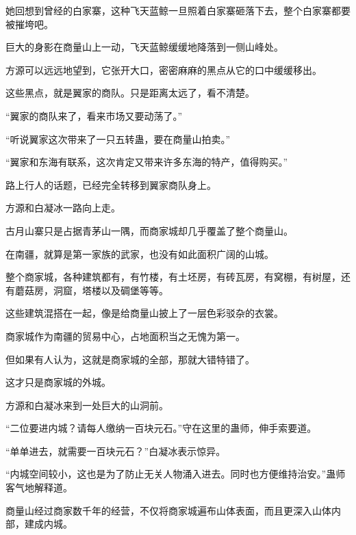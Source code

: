 \begin{this_body}
她回想到曾经的白家寨，这种飞天蓝鲸一旦照着白家寨砸落下去，整个白家寨都要被摧垮吧。

巨大的身影在商量山上一动，飞天蓝鲸缓缓地降落到一侧山峰处。

方源可以远远地望到，它张开大口，密密麻麻的黑点从它的口中缓缓移出。

这些黑点，就是翼家的商队。只是距离太远了，看不清楚。

“翼家的商队来了，看来市场又要动荡了。”

“听说翼家这次带来了一只五转蛊，要在商量山拍卖。”

“翼家和东海有联系，这次肯定又带来许多东海的特产，值得购买。”

路上行人的话题，已经完全转移到翼家商队身上。

方源和白凝冰一路向上走。

古月山寨只是占据青茅山一隅，而商家城却几乎覆盖了整个商量山。

在南疆，就算是第一家族的武家，也没有如此面积广阔的山城。

整个商家城，各种建筑都有，有竹楼，有土坯房，有砖瓦房，有窝棚，有树屋，还有蘑菇房，洞窟，塔楼以及碉堡等等。

这些建筑混搭在一起，像是给商量山披上了一层色彩驳杂的衣裳。

商家城作为南疆的贸易中心，占地面积当之无愧为第一。

但如果有人认为，这就是商家城的全部，那就大错特错了。

这才只是商家城的外城。

方源和白凝冰来到一处巨大的山洞前。

“二位要进内城？请每人缴纳一百块元石。”守在这里的蛊师，伸手索要道。

“单单进去，就需要一百块元石？”白凝冰表示惊异。

“内城空间较小，这也是为了防止无关人物涌入进去。同时也方便维持治安。”蛊师客气地解释道。

商量山经过商家数千年的经营，不仅将商家城遍布山体表面，而且更深入山体内部，建成内城。

\end{this_body}

